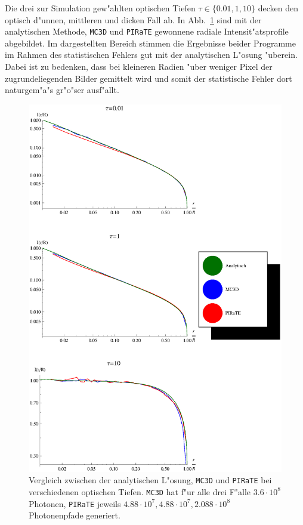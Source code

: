 	Die drei zur Simulation gew"ahlten optischen Tiefen $\tau\in\{0.01,1,10\}$ decken den optisch d"unnen, mittleren und dicken Fall ab.	In Abb.~\ref{fig:methodcomparisongraphics} sind mit der analytischen Methode, \texttt{MC3D} und \texttt{PIRaTE} gewonnene radiale Intensit"atsprofile abgebildet.
	Im dargestellten Bereich stimmen die Ergebnisse beider Programme im Rahmen des statistischen Fehlers gut mit der analytischen L"osung "uberein. Dabei ist zu bedenken, dass bei kleineren Radien "uber weniger Pixel der zugrundeliegenden Bilder gemittelt wird und somit der statistische Fehler dort naturgem"a"s gr"o"ser ausf"allt.
		\begin{figure}
			\centering
			\includegraphics[height=1.0\textheight]{methodcomparisongraphics.eps}
			\caption{Vergleich zwischen der analytischen L"osung, \texttt{MC3D} und \texttt{PIRaTE} bei verschiedenen optischen Tiefen. \texttt{MC3D} hat f"ur alle drei F"alle $3.6\cdot10^8$ Photonen, \texttt{PIRaTE} jeweils $4.88\cdot10^7,4.88\cdot10^7,2.088\cdot10^8$ Photonenpfade generiert.}
			\label{fig:methodcomparisongraphics}
		\end{figure}
	
